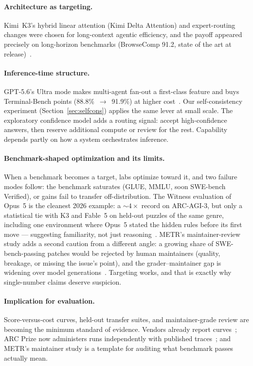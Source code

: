 \documentclass[11pt]{article}
\begin{document}
\paragraph{Architecture as targeting.} Kimi~K3's hybrid linear attention
(Kimi Delta Attention) and expert-routing changes were chosen for long-context
agentic efficiency, and the payoff appeared precisely on long-horizon
benchmarks (BrowseComp 91.2, state of the art at
release)~\cite{moonshot2026k3}.

\paragraph{Inference-time structure.} GPT-5.6's Ultra mode makes
multi-agent fan-out a first-class feature and buys Terminal-Bench points
(88.8\%~$\to$~91.9\%) at higher cost~\cite{openai2026gpt56}. Our
self-consistency experiment (Section~\ref{sec:selfcons}) applies the same lever
at small scale. The exploratory confidence model adds a routing signal: accept
high-confidence answers, then reserve additional compute or review for the
rest. Capability depends partly on how a system orchestrates inference.

\paragraph{Benchmark-shaped optimization and its limits.} When a benchmark
becomes a target, labs optimize toward it, and two failure modes follow: the
benchmark saturates (GLUE, MMLU, soon SWE-bench Verified), or gains fail to
transfer off-distribution. The Witness evaluation of Opus~5 is the cleanest
2026 example: a ${\sim}4\times$ record on ARC-AGI-3, but only a statistical tie
with K3 and Fable~5 on held-out puzzles of the same genre, including one
environment where Opus~5 stated the hidden rules before its first move ---
suggesting familiarity, not just reasoning~\cite{decoder2026opus5,techtimes2026opus5}.
METR's maintainer-review study adds a second caution from a different angle:
a growing share of SWE-bench-passing patches would be rejected by human
maintainers (quality, breakage, or missing the issue's point), and the
grader--maintainer gap is widening over model
generations~\cite{metr2026swebench}. Targeting works, and that is exactly why
single-number claims deserve suspicion.

\paragraph{Implication for evaluation.} Score-versus-cost curves, held-out
transfer suites, and maintainer-grade review are becoming the minimum standard
of evidence. Vendors already report curves~\cite{anthropic2026opus5}; ARC Prize
now administers runs independently with published
traces~\cite{arcprize2026opus5, techtimes2026opus5}; and METR's maintainer
study is a template for auditing what benchmark passes actually mean.
\end{document}
